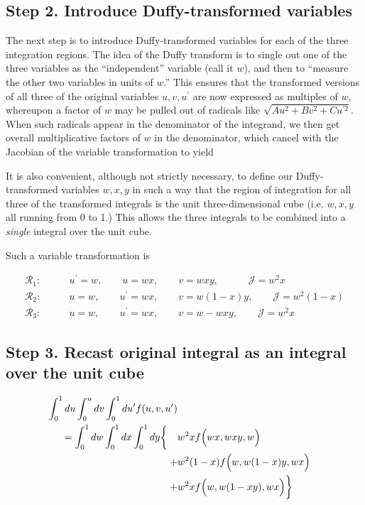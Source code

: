 \documentclass[letterpaper]{article}
\begin{document}
\subsection*{Step 2. Introduce Duffy-transformed variables} 

The next step is to introduce Duffy-transformed variables for each 
of the three integration regions. The idea of the Duffy transform
is to single out one of the three variables as the ``independent''
variable (call it $w$), and then to ``measure the other two variables
in units of $w$.'' This ensures that the transformed versions of 
all three of the original variables $u,v,u^\prime$ are now expressed
as multiples of $w$, whereupon a factor of $w$ may be pulled out 
of radicals like $\sqrt{Au^2 + Bv^2 + Cu^{\prime 2}}$. When such radicals
appear in the denominator of the integrand, we then get overall 
multiplicative factors of $w$ in the denominator, which cancel with
the Jacobian of the variable transformation to yield 

It is also convenient, although not strictly necessary, to define our
Duffy-transformed variables $w,x,y$ in such a way that the region of
integration for all three of the transformed integrals is the unit
three-dimensional cube (i.e. $w,x,y$ all running from 0 to 1.) This 
allows the three integrals to be combined into a \textit{single} integral 
over the unit cube.

Such a variable transformation is 

\begin{align*}
\mathcal{R}_1:\qquad
    &u^\prime=w, \qquad u=wx, \qquad v=wxy, \quad \qquad \mathcal{J}=w^2 x
\\
\mathcal{R}_2: \qquad 
    &u=w, \qquad u^\prime=wx, \qquad v=w(1-x)y, \qquad \mathcal{J}=w^2 (1-x)
\\
\mathcal{R}_3: \qquad 
    &u=w, \qquad u^\prime=wx, \qquad v=w-wxy, \qquad \mathcal{J}= w^2x
\end{align*}

\subsection*{Step 3. Recast original integral as an integral over 
                     the unit cube}

\begin{align}
\int_0^1 du \int_0^u dv \int_0^1 du^\prime f(u,v,u^\prime)
\nonumber \\
=\int_0^1 dw \int_0^1 dx \int_0^1 dy 
  \bigg\{\quad & w^2 x f\Big(wx, wxy, w\Big)
\nonumber \\
       + &w^2(1-x) f\Big(w, w(1-x)y, wx\Big)
\nonumber \\
       + &w^2x  f\Big(w, w(1-xy), wx\Big)
  \bigg\}
\label{TransformedEdgePanelIntegral1}
\end{align}
\end{document}
